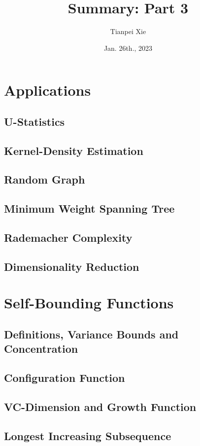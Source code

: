 \documentclass[11pt]{article}
\begin{document}
\title{Summary: Part 3}
\author{ Tianpei Xie}
\date{Jan. 26th., 2023 }
\maketitle
\tableofcontents
\newpage
\section{Applications}
\subsection{U-Statistics}
\subsection{Kernel-Density Estimation}
\subsection{Random Graph}
\subsection{Minimum Weight Spanning Tree}
\subsection{Rademacher Complexity}
\subsection{Dimensionality Reduction}

\section{Self-Bounding Functions}
\subsection{Definitions, Variance Bounds and Concentration}
\subsection{Configuration Function}
\subsection{VC-Dimension and Growth Function}
\subsection{Longest Increasing Subsequence}
\end{document}
